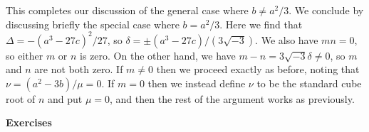 \documentclass{amsart}
\newcommand{\dl}        {\delta}
\newcommand{\Dl}        {\Delta}
\renewcommand{\:}{\colon}
\theoremstyle{definition}
\begin{document}
This completes our discussion of the general case where $b\neq a^2/3$.
We conclude by discussing briefly the special case where $b=a^2/3$.
Here we find that $\Dl=-(a^3-27c)^2/27$, so
$\dl=\pm(a^3-27c)/(3\sqrt{-3})$.  We also have $mn=0$, so either $m$
or $n$ is zero.  On the other hand, we have $m-n=3\sqrt{-3}\dl\neq 0$,
so $m$ and $n$ are not both zero.  If $m\neq 0$ then we proceed
exactly as before, noting that $\nu=(a^2-3b)/\mu=0$.  If $m=0$ then we
instead define $\nu$ to be the standard cube root of $n$ and put
$\mu=0$, and then the rest of the argument works as previously.


\begin{center}
 \Large \textbf{Exercises}
\end{center}
\end{document}
